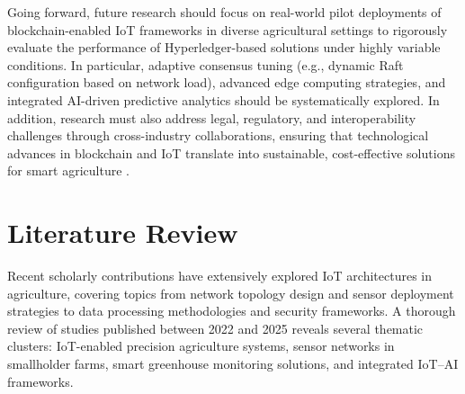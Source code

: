 \documentclass[12pt,onecolumn]{IEEEtran} %
\begin{document}
Going forward, future research should focus on real-world pilot deployments of blockchain-enabled IoT frameworks in diverse agricultural settings to rigorously evaluate the performance of Hyperledger-based solutions under highly variable conditions. In particular, adaptive consensus tuning (e.g., dynamic Raft configuration based on network load), advanced edge computing strategies, and integrated AI-driven predictive analytics should be systematically explored. In addition, research must also address legal, regulatory, and interoperability challenges through cross-industry collaborations, ensuring that technological advances in blockchain and IoT translate into sustainable, cost-effective solutions for smart agriculture \cite{bodkhe2022blockchainforprecision, yakubu2022ricechainsecureand}.

\section{Literature Review}
Recent scholarly contributions have extensively explored IoT architectures in agriculture, covering topics from network topology design and sensor deployment strategies to data processing methodologies and security frameworks. A thorough review of studies published between 2022 and 2025 reveals several thematic clusters: IoT-enabled precision agriculture systems, sensor networks in smallholder farms, smart greenhouse monitoring solutions, and integrated IoT–AI frameworks.
\end{document}
